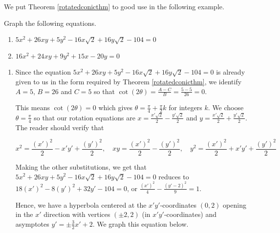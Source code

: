 \documentclass{ximera}
\begin{document}
We put Theorem \ref{rotatedconicthm} to good use in the following example.

\begin{example} \label{graphrotatedconicex} Graph the following equations.

\begin{enumerate}

\item \label{rotatedhyperbolaex}  $5x^2+26xy+5y^2-16x\sqrt{2}+16y\sqrt{2}-104 = 0$

\item \label{rotatedparabolaex} $16x^2+24xy+9y^2 +15x-20y = 0$

\end{enumerate}

\begin{explanation} 

\begin{enumerate}

\item Since the equation $5x^2+26xy+5y^2-16x\sqrt{2}+16y\sqrt{2}-104 = 0$ is already given to us in the form required by Theorem \ref{rotatedconicthm}, we identify $A = 5$, $B = 26$ and $C = 5$ so that $\cot(2\theta) = \frac{A-C}{B} = \frac{5-5}{26} = 0$.  

 

This means $\cot(2\theta) = 0$ which gives $\theta = \frac{\pi}{4} + \frac{\pi}{2} k$ for integers $k$.  We choose $\theta = \frac{\pi}{4}$ so that our rotation equations are $x = \frac{x' \sqrt{2}}{2} -\frac{y' \sqrt{2}}{2}$ and $y = \frac{x' \sqrt{2}}{2} + \frac{y' \sqrt{2}}{2}$.  The reader should verify that 


\[ x^2 = \frac{(x')^2}{2} - x'y' +\frac{(y')^2}{2}, \quad xy = \frac{(x')^2}{2} -\frac{(y')^2}{2}, \quad y^2 = \frac{(x')^2}{2} + x'y' +\frac{(y')^2}{2} \]

Making the other substitutions, we get that $5x^2+26xy+5y^2-16x\sqrt{2}+16y\sqrt{2}-104 = 0$ reduces to $18(x')^2-8(y')^2+32y'-104 = 0$, or $\frac{(x')^2}{4} -\frac{(y'-2)^2}{9} = 1$.  

 

Hence, we have a hyperbola centered at the $x'y'$-coordinates $(0,2)$ opening in the $x'$ direction with vertices $(\pm 2,2)$ (in $x'y'$-coordinates)  and asymptotes $y' = \pm \frac{3}{2} x' + 2$. We graph this equation below. 

\begin{image}
\end{image}
\end{enumerate}
\end{explanation}
\end{example}
\end{document}
